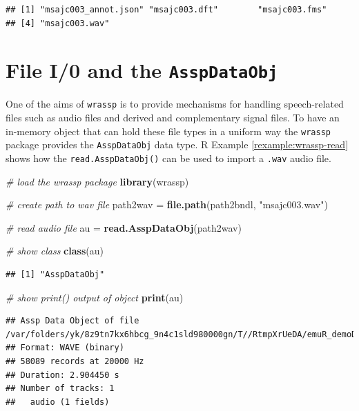 \documentclass[]{book}
\newenvironment{Shaded}{\begin{snugshade}}{\end{snugshade}}
\newcommand{\CommentTok}[1]{\textcolor[rgb]{0.56,0.35,0.01}{\textit{#1}}}
\newcommand{\KeywordTok}[1]{\textcolor[rgb]{0.13,0.29,0.53}{\textbf{#1}}}
\newcommand{\NormalTok}[1]{#1}
\newcommand{\StringTok}[1]{\textcolor[rgb]{0.31,0.60,0.02}{#1}}
\theoremstyle{definition}
\theoremstyle{definition}
\theoremstyle{definition}
\theoremstyle{remark}
\begin{document}
\begin{verbatim}
## [1] "msajc003_annot.json" "msajc003.dft"        "msajc003.fms"       
## [4] "msajc003.wav"
\end{verbatim}

\hypertarget{file-i0-and-the-asspdataobj}{%
\section{\texorpdfstring{File I/0 and the
\texttt{AsspDataObj}}{File I/0 and the AsspDataObj}}\label{file-i0-and-the-asspdataobj}}

One of the aims of \texttt{wrassp} is to provide mechanisms for handling
speech-related files such as audio files and derived and complementary
signal files. To have an in-memory object that can hold these file types
in a uniform way the \texttt{wrassp} package provides the
\texttt{AsspDataObj} data type. R Example \ref{rexample:wrassp-read}
shows how the \texttt{read.AsspDataObj()} can be used to import a
\texttt{.wav} audio file.

\begin{Shaded}
\begin{Highlighting}[]
\CommentTok{# load the wrassp package}
\KeywordTok{library}\NormalTok{(wrassp)}

\CommentTok{# create path to wav file}
\NormalTok{path2wav =}\StringTok{ }\KeywordTok{file.path}\NormalTok{(path2bndl, }\StringTok{"msajc003.wav"}\NormalTok{)}

\CommentTok{# read audio file}
\NormalTok{au =}\StringTok{ }\KeywordTok{read.AsspDataObj}\NormalTok{(path2wav)}

\CommentTok{# show class}
\KeywordTok{class}\NormalTok{(au)}
\end{Highlighting}
\end{Shaded}

\begin{verbatim}
## [1] "AsspDataObj"
\end{verbatim}

\begin{Shaded}
\begin{Highlighting}[]
\CommentTok{# show print() output of object}
\KeywordTok{print}\NormalTok{(au)}
\end{Highlighting}
\end{Shaded}

\begin{verbatim}
## Assp Data Object of file /var/folders/yk/8z9tn7kx6hbcg_9n4c1sld980000gn/T//RtmpXrUeDA/emuR_demoData/ae_emuDB/0000_ses/msajc003_bndl/msajc003.wav.
## Format: WAVE (binary)
## 58089 records at 20000 Hz
## Duration: 2.904450 s
## Number of tracks: 1 
##   audio (1 fields)
\end{verbatim}
\end{document}
